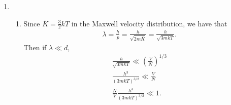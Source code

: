 \documentclass[a4paper,12pt]{article}
\begin{document}
\begin{enumerate}
    \item
        \begin{enumerate}
            \item
                \iffalse
                We will make use of the following results:
                \begin{gather}
                    \lambda = \frac{h}{m v_{\text{rms}}} \\
                    \frac{N}{V} = \frac{1}{d^3} \\
                    \overline{K.E.} = \overline{\frac{1}{2}mv^2} = \frac{1}{2} m \overline{v^2} = \frac{3}{2}kT \\
                    \Rightarrow v_{\text{rms}} = \sqrt{\overline{v^2}} = \sqrt{ \frac{3kT}{m} }.
                \end{gather}
                The conclusion is that $\lambda \ll d$ implies
                \begin{gather*}
                    \frac{h}{m v_{\text{rms}}} \ll \left( \frac{V}{N} \right)^{1/3} \\
                    \frac{h^3}{m^3 v_{\text{rms}}^3} \ll \frac{V}{N} \\
                    \frac{N}{V} \frac{h^3}{(3mkT)^{3/2}} \ll 1.
                \end{gather*}
                \fi
                Since $\overline{K} = \frac{3}{2} kT$ in the Maxwell velocity distribution, we have that
                \begin{align*}
                    \lambda = \frac{h}{p} = \frac{h}{\sqrt{2m\overline{K}}} = \frac{h}{\sqrt{3mkT}}.
                \end{align*}
                Then if $\lambda \ll d$,
                \begin{gather*}
                    \frac{h}{\sqrt{3mkT}} \ll \left( \frac{V}{N} \right)^{1/3} \\
                    \frac{h^3}{(3mkT)^{3/2}} \ll \frac{V}{N} \\
                    \frac{N}{V} \frac{h^3}{(3mkT)^{3/2}} \ll 1.
                \end{gather*}


\end{enumerate}
\end{enumerate}
\end{document}
